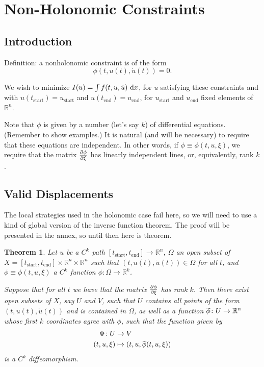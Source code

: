 \documentclass{article}
\newtheorem{theorem}{Theorem}
\theoremstyle{plain}
\theoremstyle{nonumberplain}
\newcommand{\R}{\mathbb{R}}
\newcommand{\tstart}{\mathrm{start}}
\newcommand{\tend}{\mathrm{end}}
\newcommand{\wtphi}{
  \mspace{2mu}
  \widetilde{\mspace{-2mu}\smash[t]{\phi}}
}
\begin{document}
\section{Non-Holonomic Constraints}\label{sec:nonholonomic}

\subsection{Introduction}

Definition: a nonholonomic constraint is of the form
\[\phi(t,u(t),\dot u(t)) = 0.\]

We wish to minimize $I(u) = \int f(t,u,\dot u) \,\dl x$, for $u$ satisfying these constraints and with $u(t_\tstart) = u_\tstart$ and $u(t_\tend) = u_\tend$, for $u_\tstart$ and $u_\tend$ fixed elements of $\R^n$.

Note that $\phi$ is given by a number (let's say $k$) of differential equations. (Remember to show examples.) It is natural (and will be necessary) to require that these equations are independent. In other words, if $\phi \equiv \phi(t,u,\xi)$, we require that the matrix $\diffp\phi\xi$ has linearly independent lines, or, equivalently, rank $k$.

\subsection{Valid Displacements}

The local strategies used in the holonomic case fail here, so we will need to use a kind of global version of the inverse function theorem. The proof will be presented in the annex, so until then here is theorem.

\begin{theorem}
Let $u$ be a $C^k$ path $[t_\tstart,t_\tend] \to \R^n$, $\Omega$ an open subset of $X = [t_\tstart,t_\tend] \times \R^n \times \R^n$ such that $(t,u(t),\dot u(t)) \in \Omega$ for all $t$, and $\phi \equiv \phi(t,u,\xi)$ a $C^k$ function $\phi \colon \Omega \to \R^k$.

Suppose that for all $t$ we have that the matrix $\diffp\phi\xi$ has rank $k$. Then there exist open subsets of $X$, say $U$ and $V$, such that $U$ contains all points of the form $(t,u(t),\dot u(t))$ and is contained in $\Omega$, as well as a function $\wtphi \colon U \to \R^n$ whose first $k$ coordinates agree with $\phi$, such that the function given by
\begin{align*}
\Phi \colon U &\to V\\
(t,u,\xi) &\mapsto (t,u,\wtphi(t,u,\xi))
\end{align*}
is a $C^k$ diffeomorphism.
\end{theorem}
\end{document}
